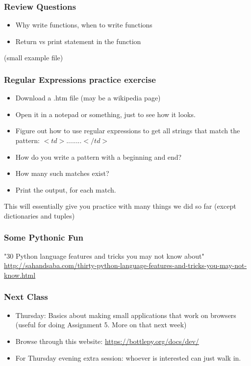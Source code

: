 \documentclass{beamer}
\begin{document}
\begin{frame}
\frametitle{Review Questions}
\begin{itemize}
\item Why write functions, when to write functions
\item Return vs print statement in the function
\end{itemize}
(small example file)
\end{frame}

\begin{frame}
\frametitle{Regular Expressions practice exercise}
\begin{itemize}
\item Download a .htm file (may be a wikipedia page)
\item Open it in a notepad or something, just to see how it looks.
\item Figure out how to use regular expressions to get all strings that match the pattern: $<td> .... .... </td>$ 
\item How do you write a pattern with a beginning and end? 
\item How many such matches exist? 
\item Print the output, for each match.
\end{itemize}
This will essentially give you practice with many things we did so far (except dictionaries and tuples)
\end{frame}

\begin{frame}%
\frametitle{Some Pythonic Fun}
"30 Python language features and tricks you may not know about" \\
\url{http://sahandsaba.com/thirty-python-language-features-and-tricks-you-may-not-know.html}
\end{frame}

\begin{frame}
\frametitle{Next Class}
\begin{itemize}
\item Thursday: Basics about making small applications that work on browsers (useful for doing Assignment 5. More on that next week)
\item Browse through this website: \url{https://bottlepy.org/docs/dev/}
\item For Thursday evening extra session: whoever is interested can just walk in. 
\end{itemize}
\end{frame}
\end{document}
